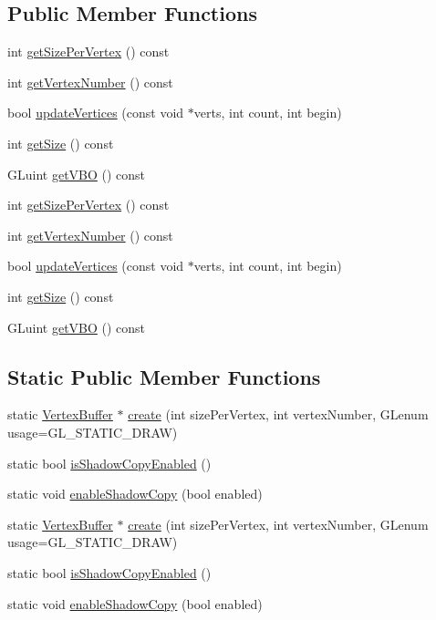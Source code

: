 \subsection*{Public Member Functions}
\begin{DoxyCompactItemize}
\item 
int \hyperlink{classVertexBuffer_abb3634042a6888dd732489bf7c25d275}{get\+Size\+Per\+Vertex} () const
\item 
int \hyperlink{classVertexBuffer_a0146774ed7a06bcf70ba2647ba18f51b}{get\+Vertex\+Number} () const
\item 
bool \hyperlink{classVertexBuffer_a457b7753668e6d83dbd8b69af245bf2e}{update\+Vertices} (const void $\ast$verts, int count, int begin)
\item 
int \hyperlink{classVertexBuffer_a75077b81d0067d0255a48fe608370eb8}{get\+Size} () const
\item 
G\+Luint \hyperlink{classVertexBuffer_ad2be81b35e6a0d74499b5c9e9177cac6}{get\+V\+BO} () const
\item 
int \hyperlink{classVertexBuffer_abb3634042a6888dd732489bf7c25d275}{get\+Size\+Per\+Vertex} () const
\item 
int \hyperlink{classVertexBuffer_a0146774ed7a06bcf70ba2647ba18f51b}{get\+Vertex\+Number} () const
\item 
bool \hyperlink{classVertexBuffer_a457b7753668e6d83dbd8b69af245bf2e}{update\+Vertices} (const void $\ast$verts, int count, int begin)
\item 
int \hyperlink{classVertexBuffer_a75077b81d0067d0255a48fe608370eb8}{get\+Size} () const
\item 
G\+Luint \hyperlink{classVertexBuffer_ad2be81b35e6a0d74499b5c9e9177cac6}{get\+V\+BO} () const
\end{DoxyCompactItemize}
\subsection*{Static Public Member Functions}
\begin{DoxyCompactItemize}
\item 
static \hyperlink{classVertexBuffer}{Vertex\+Buffer} $\ast$ \hyperlink{classVertexBuffer_a493af822ba109251e4e108f06d6b58d6}{create} (int size\+Per\+Vertex, int vertex\+Number, G\+Lenum usage=G\+L\+\_\+\+S\+T\+A\+T\+I\+C\+\_\+\+D\+R\+AW)
\item 
static bool \hyperlink{classVertexBuffer_a04b445671ff9081dc101153c0b689e4c}{is\+Shadow\+Copy\+Enabled} ()
\item 
static void \hyperlink{classVertexBuffer_a0a7fbf604eae9d67af9c161dcfb129fd}{enable\+Shadow\+Copy} (bool enabled)
\item 
static \hyperlink{classVertexBuffer}{Vertex\+Buffer} $\ast$ \hyperlink{classVertexBuffer_ae7c75c1e69e504142c9df677e66e5cea}{create} (int size\+Per\+Vertex, int vertex\+Number, G\+Lenum usage=G\+L\+\_\+\+S\+T\+A\+T\+I\+C\+\_\+\+D\+R\+AW)
\item 
static bool \hyperlink{classVertexBuffer_a04b445671ff9081dc101153c0b689e4c}{is\+Shadow\+Copy\+Enabled} ()
\item 
static void \hyperlink{classVertexBuffer_a0a7fbf604eae9d67af9c161dcfb129fd}{enable\+Shadow\+Copy} (bool enabled)
\end{DoxyCompactItemize}
